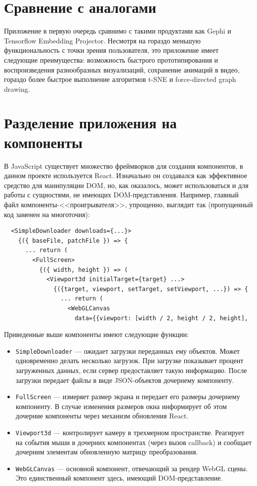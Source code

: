 \section{Сравнение с аналогами}

Приложение в первую очередь сравнимо с такими продуктами как Gephi и Tensorflow Embedding Projector. Несмотря на гораздо меньшую функциональность с точки зрения пользователя, это приложение имеет следующие преимущества: возможность быстрого прототипирования и воспроизведения разнообразных визуализаций, сохранение анимаций в видео, гораздо более быстрое выполнение алгоритмов t-SNE и force-directed graph drawing.

\section{Разделение приложения на компоненты}

В JavaScript существует множество фреймворков для создания компонентов, в данном проекте используется React. Изначально он создавался как эффективное средство для манипуляции DOM, но, как оказалось, может использоваться и для работы с сущностями, не имеющих DOM-представления. Например, главный файл компоненты-<<проигрывателя>>, упрощенно, выглядит так (пропущенный код заменен на многоточия):
\begin{verbatim}
  <SimpleDownloader downloads={...}>
    {({ baseFile, patchFile }) => {
      ... return (
        <FullScreen>
          {({ width, height }) => (
            <Viewport3d initialTarget={target} ...>
              {({target, viewport, setTarget, setViewport, ...}) => {
                ... return (
                  <WebGLCanvas
                    data={{viewport: [width / 2, height / 2, height],
\end{verbatim}
Приведенные выше компоненты имеют следующие функции:
\begin{itemize}
\item \texttt{SimpleDownloader} --- ожидает загрузки переданных ему объектов. Может одновременно делать несколько загрузок. При загрузке показывает процент загруженных данных, если сервер предоставляет такую информацию. После загрузки передает файлы в виде JSON-объектов дочернему компоненту.
\item \texttt{FullScreen} --- измеряет размер экрана и передает его размеры дочернему компоненту. В случае изменения размеров окна информирует об этом дочерние компоненты через механизм обновления React.
\item \texttt{Viewport3d} --- контролирует камеру в трехмерном пространстве. Реагирует на события мыши в дочерних компонентах (через вызов callback) и сообщает дочерним элементам обновленную матрицу преобразования.
\item \texttt{WebGLCanvas} --- основной компонент, отвечающий за рендер WebGL сцены. Это единственный компонент здесь, имеющий DOM-представление.
\end{itemize}


